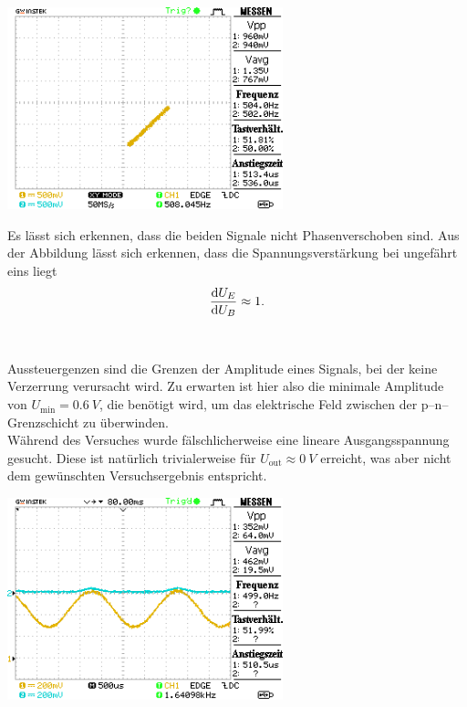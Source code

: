 \documentclass[10pt]{article}
\newenvironment{Figure}
  {\par\medskip\noindent\minipage{\linewidth}}
  {\endminipage\par\medskip}
\begin{document}
\begin{multicols}{2}
\begin{Figure}
                \centering
                \includegraphics[width=0.6\textwidth]{data/DS0003.png}
        \end{Figure}
        Es lässt sich erkennen, dass die beiden Signale nicht Phasenverschoben sind.
        Aus der Abbildung lässt sich erkennen, dass die Spannungsverstärkung bei ungefährt eins liegt
        \begin{align} 
                \diff[]{U_E}{U_B}\approx 1
        .\end{align}\\\\
        Aussteuergenzen sind die Grenzen der Amplitude eines Signals, bei der keine Verzerrung verursacht wird.
        Zu erwarten ist hier also die minimale Amplitude von $U_{\text{min}}=\SI{0.6}{V}$, die benötigt wird, um das elektrische Feld zwischen der p--n--Grenzschicht zu überwinden.
        \\\indent Während des Versuches wurde fälschlicherweise eine lineare Ausgangsspannung gesucht.
        Diese ist natürlich trivialerweise für $U_{\text{out}}\approx \SI{0}{V}$ erreicht, was aber nicht dem gewünschten Versuchsergebnis entspricht.
        \begin{Figure}
                \centering
                \includegraphics[width=0.6\textwidth]{data/DS0005.png}

\end{Figure}
\end{multicols}
\end{document}
